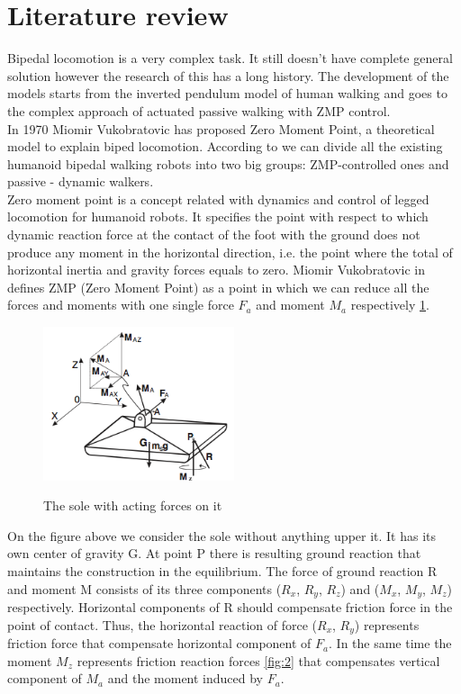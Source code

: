 \documentclass[11pt,a4paper]{article}
\begin{document}
\section{Literature review}
Bipedal locomotion is a very complex task. It still doesn't have complete general solution however the research of this has a long history. The development of the models starts from the inverted pendulum model of human walking and goes to the complex approach of actuated passive walking with ZMP control.\\
In 1970 Miomir Vukobratovic has proposed Zero Moment Point, a theoretical model to explain biped locomotion.
According to \cite{manchester2011stable} we can divide all the existing humanoid bipedal walking robots into two big groups: ZMP-controlled ones and passive - dynamic walkers.\\
Zero moment point is a concept related with dynamics and control of legged locomotion for humanoid robots. It specifies the point with respect to which dynamic reaction force at the contact of the foot with the ground does not produce any moment in the horizontal direction, i.e. the point where the total of horizontal inertia and gravity forces equals to zero.
Miomir Vukobratovic in \cite{vukobratovic2004zero} defines ZMP (Zero Moment Point) as a point in which we can reduce all the forces and moments with one single force $F_a$ and moment $M_a$ respectively  \cref{fig:1}.
	
	\begin{figure}[h!]
		\vspace{-0.2cm}
		\centering
		{\includegraphics[width=0.5\textwidth]{1}}
		\caption{The sole with acting forces on it}
		\label{fig:1}
		\vspace{-0.1cm}
	\end{figure}

On the figure above we consider the sole without anything upper it. It has its own center of gravity G. At point P there is resulting ground reaction that maintains the construction in the equilibrium. The force of ground reaction R and moment M consists of its three components ($R_x$, $R_y$, $R_z$) and ($M_x$, $M_y$, $M_z$) respectively. Horizontal components of R should compensate friction force in the point of contact. Thus, the horizontal reaction of force ($R_x$, $R_y$) represents 
friction force that compensate horizontal component of $F_a$. In the same time the moment $M_z$ represents friction reaction forces \cref{fig:2} that compensates vertical component of $M_a$ and the moment induced by $F_a$. \cite{vukobratovic2004zero}
\end{document}

